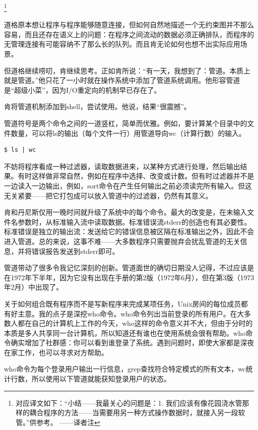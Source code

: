 \documentclass[a4paper,12pt,UTF8,twoside]{ctexbook}
\begin{document}
\footnote{对应译文如下：“小结——我最关心的问题是：1. 我们应该有像花园浇水管那样的耦合程序的方法——当需要用另一种方式操作数据时，就接入另一段软管。”供参考。 ——译者注}

道格原本想让程序与程序能够随意连接，但如何自然地描述一个无约束图并不那么容易，而且还存在语义上的问题：在程序之间流动的数据必须正确排队，而程序的无管理连接有可能容纳不了那么长的队列。而且肯无论如何也想不出实际应用场景。

但道格继续唠叨，肯继续思考。正如肯所说：“有一天，我想到了：管道。本质上就是管道。”他只花了一小时就在操作系统中添加了管道系统调用。他形容管道是“超级小菜”，因为I/O重定向的机制早已存在了。

肯将管道机制添加到shell，尝试使用。他说，结果“很震撼”。

管道符号是两个命令之间的一道竖杠，简单而优雅。例如，要计算某个目录中的文件数量，可以将ls的输出（每个文件一行）用管道导向wc（计算行数）的输入。

\begin{lstlisting}
$ ls | wc
\end{lstlisting}

不妨将程序看成一种过滤器，读取数据进来，以某种方式进行处理，然后输出结果。有时这样做非常自然，例如在程序中选择、改变或计数。但有时过滤器并不是一边读入一边输出，例如，sort命令在产生任何输出之前必须读完所有输入。但这无关紧要——把它打包成可以放入管道中的过滤器，仍然有其意义。

肯和丹尼斯仅用一晚时间就升级了系统中的每个命令。最大的改变是，在未输入文件名参数时，从标准输入流中读取数据。标准错误流stderr的创造也有其必要性。标准错误是独立的输出流：发送给它的错误信息被区隔在标准输出之外，因此不会进入管道。总的来说，这事不难——大多数程序只需要抛弃会扰乱管道的无关信息，并将错误报告发送到stderr即可。

管道带动了很多令我记忆深刻的创新。管道面世的确切日期没人记得，不过应该是在1972年下半年，因为它没有出现在手册的第2版（1972年6月），但在第3版（1973年2月）中出现了。

关于如何组合既有程序而不是写新程序来完成某项任务，Unix房间的每位成员都有好主意。我的点子是深挖who命令。who命令列出当前登录的所有用户。在大多数人都在自己的计算机上工作的今天，who这样的命令意义并不大，但由于分时的本质是多人共享同一台计算机，所以知道还有谁也在使用系统会很有帮助。who命令确实增加了社群感：你可以看到谁登录了系统。遇到问题时，即使大家都是深夜在家工作，也可以寻求对方帮助。

who命令为每个登录用户输出一行信息，grep查找符合特定模式的所有文本，wc统计行数，所以使用以下管道就能获知登录用户的状态。
\end{document}
